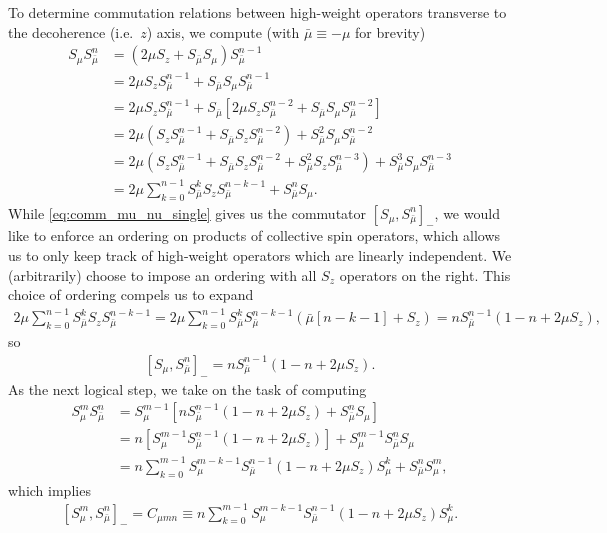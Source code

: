 \documentclass[aps,notitlepage,nofootinbib,11pt]{revtex4-1}
\newcommand{\p}[1]{\left(#1\right)} %
\renewcommand{\sp}[1]{\left[#1\right]} %
\newcommand{\bmu}{{\bar\mu}}
\newcommand{\1}{\mathds{1}}
\begin{document}
To determine commutation relations between high-weight operators
transverse to the decoherence (i.e.~$z$) axis, we compute (with
$\bmu\equiv-\mu$ for brevity)
\begin{align}
  S_\mu S_\bmu^n
  &= \p{2\mu S_z + S_\bmu S_\mu} S_\bmu^{n-1} \\
  &= 2\mu S_z S_\bmu^{n-1} + S_\bmu S_\mu S_\bmu^{n-1} \\
  &= 2\mu S_z S_\bmu^{n-1}
  + S_\bmu \sp{2\mu S_z S_\bmu^{n-2}
    + S_\bmu S_\mu S_\bmu^{n-2}} \\
  &= 2\mu \p{S_z S_\bmu^{n-1} + S_\bmu S_z S_\bmu ^{n-2}}
  + S_\bmu^2 S_\mu S_\bmu^{n-2} \\
  &= 2\mu \p{S_z S_\bmu^{n-1} + S_\bmu S_z S_\bmu ^{n-2}
    + S_\bmu^2 S_z S_\bmu ^{n-3}} + S_\bmu^3 S_\mu S_\bmu^{n-3} \\
  &= 2\mu \sum_{k=0}^{n-1} S_\bmu^k S_z S_\bmu^{n-k-1}
  + S_\bmu^n S_\mu.
  \label{eq:comm_mu_nu_single}
\end{align}
While \eqref{eq:comm_mu_nu_single} gives us the commutator
$\sp{S_\mu,S_\bmu^n}_-$, we would like to enforce an ordering on
products of collective spin operators, which allows us to only keep
track of high-weight operators which are linearly independent.  We
(arbitrarily) choose to impose an ordering with all $S_z$ operators on
the right.  This choice of ordering compels us to expand
\begin{align}
  2 \mu \sum_{k=0}^{n-1} S_\bmu^k S_z S_\bmu^{n-k-1}
  = 2 \mu \sum_{k=0}^{n-1}
  S_\bmu^k S_\bmu^{n-k-1} \p{\bmu\sp{n-k-1} + S_z}
  = n S_\bmu^{n-1}\p{1 - n + 2\mu S_z},
\end{align}
so
\begin{align}
  \sp{S_\mu, S_\bmu^n}_-
  = n S_\bmu^{n-1}\p{1 - n + 2\mu S_z}.
\end{align}
As the next logical step, we take on the task of computing
\begin{align}
  S_\mu^m S_\bmu^n
  &= S_\mu^{m-1} \sp{n S_\bmu^{n-1}\p{1 - n + 2\mu S_z}
    + S_\bmu^n S_\mu} \\
  &= n \sp{S_\mu^{m-1} S_\bmu^{n-1} \p{1 - n + 2\mu S_z}}
  + S_\mu^{m-1} S_\bmu^n S_\mu \\
  &= n \sum_{k=0}^{m-1} S_\mu^{m-k-1} S_\bmu^{n-1}
  \p{1 - n + 2\mu S_z} S_\mu^k + S_\bmu^n S_\mu^m,
\end{align}
which implies
\begin{align}
  \sp{S_\mu^m, S_\bmu^n}_-
  = C_{\mu mn}
  \equiv n \sum_{k=0}^{m-1} S_\mu^{m-k-1} S_\bmu^{n-1}
  \p{1 - n + 2\mu S_z} S_\mu^k.
\end{align}
\end{document}
